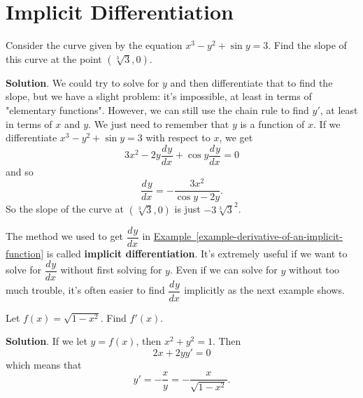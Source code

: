 \documentclass[10pt,]{book}
\newcommand{\terminology}[1]{\textbf{#1}}
\theoremstyle{ptxplainnotitle}
\theoremstyle{ptxplaintitle}
\theoremstyle{ptxplainnotitle}
\theoremstyle{ptxplaintitle}
\theoremstyle{ptxplainnotitle}
\theoremstyle{ptxplaintitle}
\theoremstyle{ptxdefinitionnotitle}
\theoremstyle{ptxdefinitiontitle}
\theoremstyle{ptxdefinitionnotitle}
\theoremstyle{ptxdefinitiontitle}
\theoremstyle{ptxdefinitionnotitle}
\theoremstyle{ptxdefinitiontitle}
\theoremstyle{ptxdefinitionnotitle}
\theoremstyle{ptxdefinitiontitle}
\theoremstyle{ptxdefinitionnotitle}
\theoremstyle{ptxdefinitiontitle}
\numberwithin{equation}{section}
\newcommand{\dv}[3][]{\dfrac{d^{#1} #2}{d #3^{#1}}}
\begin{document}
\section[{Implicit Differentiation}]{Implicit Differentiation}\label{section-implicit-differentiation}
\begin{example}\label{example-derivative-of-an-implicit-function}
\hypertarget{p-158}{}%
Consider the curve given by the equation \(x^{3} - y^{2} + \sin y = 3\). Find the slope of this curve at the point \((\sqrt[3]{3},0)\).%
\par\smallskip%
\noindent\textbf{Solution}.\hypertarget{solution-33}{}\quad%
\hypertarget{p-159}{}%
We could try to solve for \(y\) and then differentiate that to find the slope, but we have a slight problem: it's impossible, at least in terms of "elementary functions". However, we can still use the chain rule to find \(y'\), at least in terms of \(x\) and \(y\). We just need to remember that \(y\) is a function of \(x\). If we differentiate \(x^{3} - y^{2} + \sin y = 3\) with respect to \(x\), we get%
\begin{equation*}
3x^{2} - 2y\dv{y}{x} + \cos y \dv{y}{x} = 0
\end{equation*}
and so%
\begin{equation*}
\dv{y}{x} = -\frac{3x^{2}}{\cos y - 2y}.
\end{equation*}
So the slope of the curve at \((\sqrt[3]{3},0)\) is just \(-3\sqrt[3]{3}^{2}\).%
\end{example}
\hypertarget{p-160}{}%
The method we used to get \(\dv{y}{x}\) in \hyperref[example-derivative-of-an-implicit-function]{Example~\ref{example-derivative-of-an-implicit-function}} is called \terminology{implicit differentiation}. It's extremely useful if we want to solve for \(\dv{y}{x}\) without first solving for \(y\). Even if we can solve for \(y\) without too much trouble, it's often easier to find \(\dv{y}{x}\) implicitly as the next example shows.%
\begin{example}\label{example-implicit-differentiation-to-save-algebra}
\hypertarget{p-161}{}%
Let \(f(x) = \sqrt{1-x^{2}}\). Find \(f'(x)\).%
\par\smallskip%
\noindent\textbf{Solution}.\hypertarget{solution-34}{}\quad%
\hypertarget{p-162}{}%
If we let \(y=f(x)\), then \(x^{2} + y^{2} = 1\). Then%
\begin{equation*}
2x + 2yy' = 0
\end{equation*}
which means that%
\begin{equation*}
y' = -\frac{x}{y} = -\frac{x}{\sqrt{1-x^{2}}}.
\end{equation*}
%
\end{example}
\end{document}
